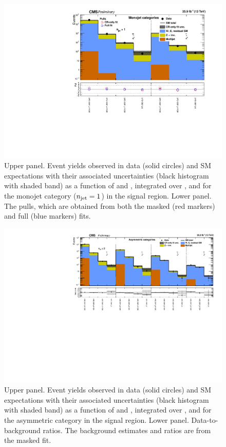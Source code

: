 \clearpage
\begin{figure}[h!]
  \centering
  \caption{Upper panel. Event yields observed in data (solid circles)
    and SM expectations with their associated uncertainties (black
    histogram with shaded band) as a function of \nb and \scalht,
    integrated over \mht, and for the monojet category ($n_{\text{jet}} = 1$)
    in the signal region. Lower panel. The pulls, which are obtained
    from both the masked (red markers) and full (blue markers) fits. }
  \label{fig:mr_mono_pulls}
  \includegraphics[width=1.\linewidth]{figures/results/36invfb/mono/summaryPlot_Monojet_prefit_overlay_fit_b}
\end{figure}


\clearpage
\begin{figure}[h!]
  \centering
  \caption{Upper panel. Event yields observed in data (solid circles)
    and SM expectations with their associated uncertainties (black
    histogram with shaded band) as a function of \nb and \scalht,
    integrated over \mht, and for the asymmetric \njet category
    in the signal region. Lower panel. Data-to-background ratios. The
    background estimates and ratios are from the masked fit. }
  \label{fig:mr_asym_pre}
  \includegraphics[width=1.\linewidth]{figures/results/36invfb/asym/summaryPlot_Asymmetric_prefit}
\end{figure}

